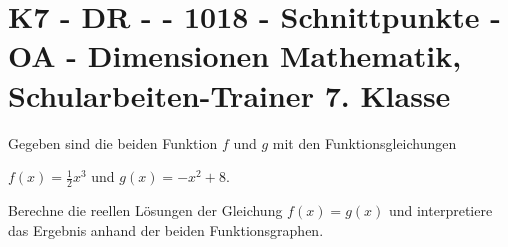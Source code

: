 \section{K7 - DR -  - 1018 - Schnittpunkte - OA - Dimensionen Mathematik, Schularbeiten-Trainer 7. Klasse}

\begin{beispiel}[K7 - DR]{1} %
Gegeben sind die beiden Funktion $f$ und $g$ mit den Funktionsgleichungen 

$f(x)=\frac{1}{2}x^3$ und $g(x)=-x^2+8$.

Berechne die reellen Lösungen der Gleichung $f(x)=g(x)$ und interpretiere das Ergebnis anhand der beiden Funktionsgraphen.\leer

				
				\end{beispiel}